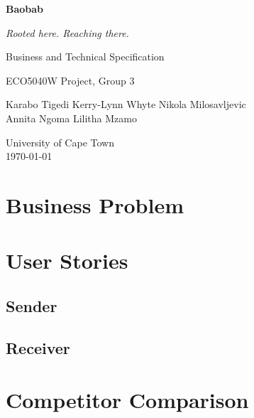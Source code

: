 \documentclass[11pt,a4paper]{article}
\begin{document}
\begin{titlepage}
  \centering
  \vspace*{3cm}
  {\Huge\bfseries\color{navy} Baobab\par}
  \vspace{0.4em}
  {\Large\itshape\color{ink} Rooted here. Reaching there.\par}
  \vspace{2em}
  {\LARGE Business and Technical Specification\par}
  \vspace{0.6em}
  {\large ECO5040W Project, Group 3\par}
  \vspace{3em}
  {\large Karabo Tigedi \quad Kerry-Lynn Whyte \quad Nikola Milosavljevic\\[0.3em]
          Annita Ngoma \quad Lilitha Mzamo\par}
  \vfill
  {\large University of Cape Town\\ \today\par}
\end{titlepage}

\tableofcontents
\newpage

\section{Business Problem}\label{sec:problem}

\section{User Stories}\label{sec:stories}

\subsection{Sender}

\subsection{Receiver}

\section{Competitor Comparison}\label{sec:competitors}
\end{document}
